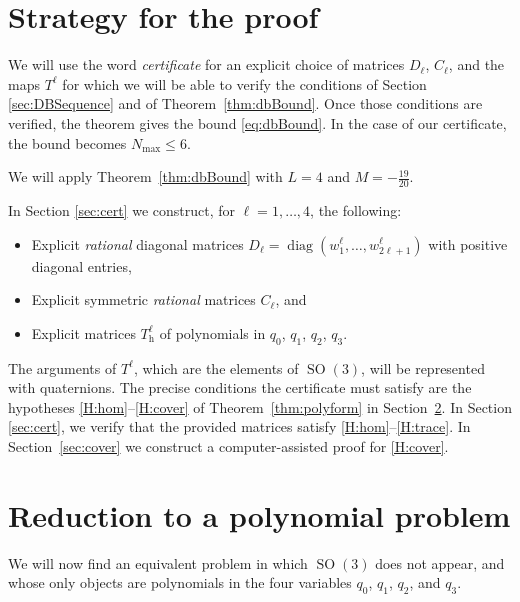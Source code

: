 \documentclass[reqno]{amsart}
\theoremstyle{definition}
\DeclareMathOperator{\SO}{SO}
\DeclareMathOperator{\diag}{diag}
\begin{document}
\section{Strategy for the proof}\label{sec:Strategy}

We will use the word \emph{certificate} for an explicit choice of matrices $D_{\ell}$, $C_{\ell}$,
and the maps $T^{\ell}$ for which we will be able to verify the conditions of Section \ref{sec:DBSequence}
and of Theorem~\ref{thm:dbBound}. Once those conditions are verified, the theorem gives the bound
\eqref{eq:dbBound}. In the case of our certificate, the bound becomes $N_{\max}\le6$.

We will apply Theorem~\ref{thm:dbBound} with $L=4$ and $M=-\tfrac{19}{20}$.

In Section \ref{sec:cert} we construct, for $\ell=1,\dots,4$, the following:
\begin{itemize}\item Explicit \emph{rational} diagonal matrices
$D_\ell=\diag(w^\ell_1,\dots,w^\ell_{2\ell+1})$ with positive diagonal entries,
\item Explicit symmetric
\emph{rational} matrices $C_\ell$, and 
\item Explicit matrices $T^\ell_{\mathrm h}$ of polynomials in $q_0$, $q_1$, $q_2$, $q_3$. 
\end{itemize} 
The arguments of $T^{\ell}$, which are the elements of $\SO(3)$, will be represented with
quaternions. The precise conditions the certificate must satisfy are the hypotheses
\ref{H:hom}--\ref{H:cover} of Theorem~\ref{thm:polyform} in Section~\ref{sec:quat}. In Section
\ref{sec:cert}, we verify that the provided matrices satisfy \ref{H:hom}--\ref{H:trace}. In 
Section~\ref{sec:cover} we construct a computer-assisted proof for \ref{H:cover}.
 

\section{Reduction to a polynomial problem}\label{sec:quat}
We will now find an equivalent problem in which $\SO(3)$ does not appear, and whose only objects
are polynomials in the four variables $q_0$, $q_1$, $q_2$, and $q_3$.
\end{document}

